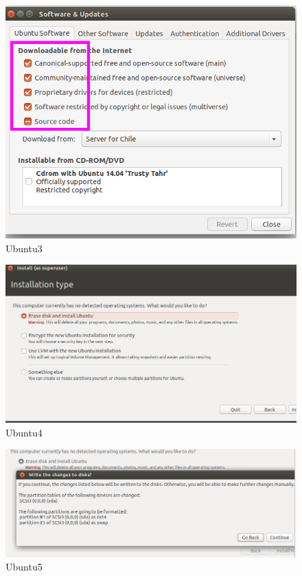 \begin{figure}[!ht]
	\centering
	\includegraphics[scale=0.5]{input/images/ub3.png}                   
	\caption{Ubuntu3}
	\hspace{-1.5em}
\end{figure}
\begin{figure}[!ht]
	\centering
	\includegraphics[scale=0.5]{input/images/ub4.png}                   
	\caption{Ubuntu4}
	\hspace{-1.5em}
\end{figure}
\begin{figure}[!ht]
	\centering
	\includegraphics[scale=0.5]{input/images/ub5.png}                   
	\caption{Ubuntu5}
	\hspace{-1.5em}
\end{figure}
